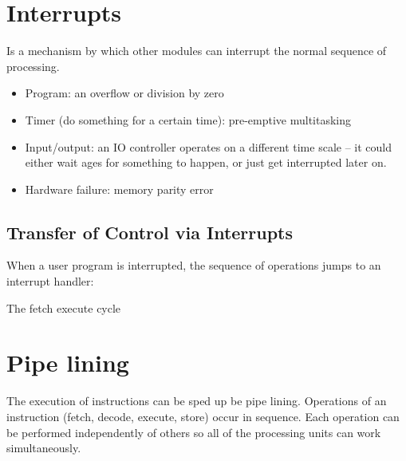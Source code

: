 \section{Interrupts}\label{sec:interrupts}

Is a mechanism by which other modules can interrupt the normal sequence of processing.

\begin{itemize}
	\item Program: an overflow or division by zero
	\item Timer (do something for a certain time): pre-emptive multitasking
	\item Input/output: an IO controller operates on a different time scale -- it could either wait ages for something to happen, or just get interrupted later on.
	\item Hardware failure: memory parity error
\end{itemize}

\subsection{Transfer of Control via Interrupts}\label{sub:transfer_of_control_via_interrupts}

When a user program is interrupted, the sequence of operations jumps to an interrupt handler:

\begin{highlight}{The fetch execute cycle}
\end{highlight}

\section{Pipe lining}\label{sec:pipe_lining}

The execution of instructions can be sped up be pipe lining.
Operations of an instruction (fetch, decode, execute, store) occur in sequence.
Each operation can be performed independently of others so all of the processing units can work simultaneously.

